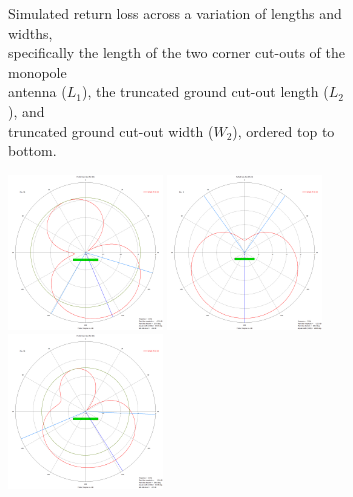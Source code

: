 \documentclass[colorlinks,11pt,a4paper,normalphoto,withhyper,ragged2e]{altareport}
\begin{document}
\begin{figure}[ht!]
\begin{subfigure}[b]{0.45\linewidth}
    \caption{ Simulated return loss across a variation of lengths and widths, \\specifically the length of the two corner cut-outs of the monopole \\antenna ($L_1$), the truncated ground cut-out length ($L_2$), and \\truncated ground cut-out width ($W_2$), ordered top to bottom.}\label{fig:recreate_rtn_loss_param_sweeps}
	\end{subfigure}
	\begin{subfigure}[b]{0.45\linewidth}
	\centering
		\includegraphics[width=0.45\textwidth]{Images/S1,1-fig-6-recreation-3GHz-YZ.png}
    	\hfill
		\includegraphics[width=0.45\textwidth]{Images/S1,1-fig-6-recreation-3GHz-XZ.png}\\[2mm]
		\includegraphics[width=0.45\textwidth]{Images/S1,1-fig-6-recreation-6GHz-YZ.png}

\end{subfigure}
\end{figure}
\end{document}
